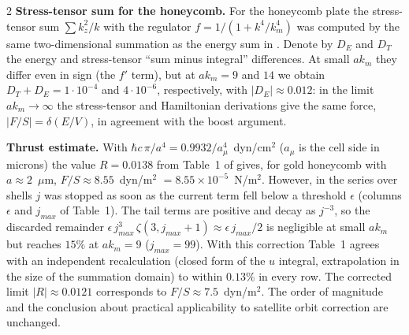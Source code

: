 \documentclass[twoside, 10pt]{article}
\def\myvspacebeforesubsection{-2.0mm}
\def\myvspaceaftersubsection{-2.5mm}
\begin{document}
\begin{multicols}{2}
\textbf{Stress-tensor sum for the honeycomb.} For the honeycomb plate the stress-tensor sum
\(\sum k_z^2/k\) with the regulator \(f=1/(1+k^4/k_m^4)\) was computed by the same two-dimensional
summation as the energy sum in \cite{Drozdov2024}. Denote by \(D_E\) and \(D_T\) the energy and
stress-tensor ``sum minus integral'' differences. At small \(ak_m\) they differ even in sign (the
\(f'\) term), but at \(ak_m=9\) and \(14\) we obtain \(D_T+D_E=1\cdot10^{-4}\) and
\(4\cdot10^{-6}\), respectively, with \(|D_E|\approx0.012\): in the limit \(ak_m\to\infty\) the
stress-tensor and Hamiltonian derivations give the same force, \(|F/S|=\delta(E/V)\), in agreement
with the boost argument.

\textbf{Thrust estimate.} With \(\hbar c\,\pi/a^4=0.9932/a_\mu^4\)~dyn/cm\(^2\) (\(a_\mu\) is the
cell side in microns) the value \(R=0.0138\) from Table~1 of \cite{Drozdov2024} gives, for gold
honeycomb with \(a\approx2\)~\(\mu\)m, \(F/S\approx8.55\)~dyn/m\(^2\)
\(=8.55\times10^{-5}\)~N/m\(^2\). However, in \cite{Drozdov2024} the series over shells \(j\) was stopped as soon
as the current term fell below a threshold \(\epsilon\) (columns \(\epsilon\) and \(j_{max}\) of
Table~1). The tail terms are positive and decay as \(j^{-3}\), so the discarded remainder
\(\epsilon\,j_{max}^3\,\zeta(3,j_{max}+1)\approx\epsilon\,j_{max}/2\) is negligible at small \(ak_m\)
but reaches \(15\%\) at \(ak_m=9\) (\(j_{max}=99\)). With this correction Table~1 agrees with an
independent recalculation (closed form of the \(u\) integral, extrapolation in the size of the
summation domain) to within \(0.13\%\) in every row. The corrected limit \(|R|\approx0.0121\)
corresponds to \(F/S\approx7.5\)~dyn/m\(^2\). The order of magnitude and the conclusion about practical
applicability to satellite orbit correction are unchanged.

\vspace{\myvspacebeforesubsection}
\subsection*{}
\vspace{\myvspaceaftersubsection}



\end{multicols}
\end{document}

